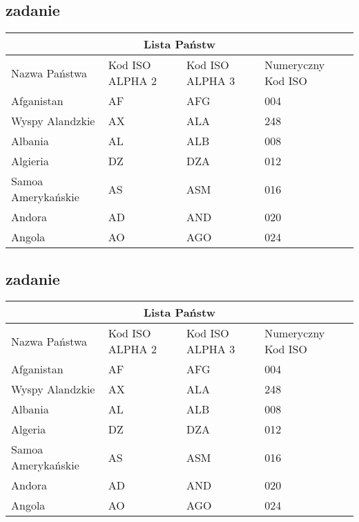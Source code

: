 \documentclass[12pt,a4paper]{article}
\begin{document}
\begin{center}
	\section{zadanie}
	\setlength{\arrayrulewidth}{0.5mm}
	\setlength{\tabcolsep}{10pt}
	\renewcommand{\arraystretch}{1.5}
	\begin{tabular}{|p{4cm}||p{2cm}|p{2cm}|p{2cm}|}
		\cline{1-4}
		\multicolumn{4}{|c|}{Lista Państw} \\
		\cline{1-4}
		\hline
		Nazwa Państwa & Kod ISO ALPHA 2 & Kod ISO ALPHA 3 & Numeryczny Kod ISO  \\
		\hline 
		Afganistan & AF & AFG & 004\\
		Wyspy Alandzkie & AX & ALA & 248\\
		Albania & AL & ALB & 008\\
		Algieria & DZ & DZA & 012\\
		Samoa Amerykańskie & AS & ASM & 016\\
		Andora & AD & AND & 020\\
		Angola & AO & AGO & 024\\
		\hline
	\end{tabular}
\end{center}
\begin{center}
	\section{zadanie}
\setlength{\arrayrulewidth}{0.5mm}
\setlength{\tabcolsep}{10pt}
\renewcommand{\arraystretch}{1.5}
	\begin{tabular}{|p{4cm}||p{2cm}|p{2cm}|p{2cm}|}
		\hline
		\multicolumn{4}{|c|}{Lista Państw}\\
		\hline
		\rowcolor{Cyan} Nazwa Państwa & Kod ISO ALPHA 2 & Kod ISO ALPHA 3 & Numeryczny Kod ISO \\
		\hline
		Afganistan & AF & AFG & 004 \\
		\rowcolor{SkyBlue}Wyspy Alandzkie & AX & ALA & 248 \\
		Albania & AL & ALB & 008 \\
		\rowcolor{SkyBlue}Algeria & DZ & DZA & 012 \\
		Samoa Amerykańskie & AS & ASM & 016 \\
		\rowcolor{SkyBlue}Andora & AD & AND & 020 \\
		Angola & AO & AGO & 024\\
		\hline
	\end{tabular}
\end{center}
\end{document}
